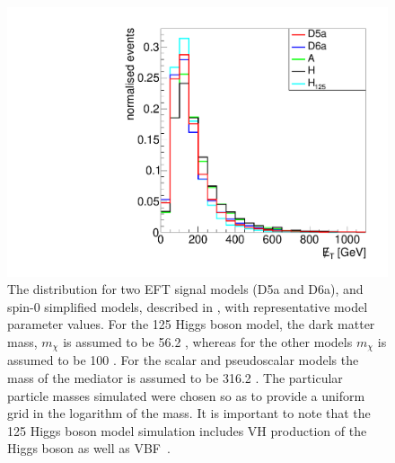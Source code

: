 \begin{figure}
  \includegraphics[width=\largefigwidth]{plots/interp/modelmet.pdf}
  \caption[The \MET distribution for two EFT signal models (D5a and D6a), and spin-0 simplified models, described in , with representative model parameter values. For the 125 \GeV Higgs boson model, the dark matter mass, $m_{\chi}$ is assumed to be 56.2 \GeV, whereas for the other models $m_{\chi}$ is assumed to be 100 \GeV . For the scalar and pseudoscalar models the mass of the mediator is assumed to be 316.2 \GeV. The particular particle masses simulated were chosen so as to provide a uniform grid in the logarithm of the mass. It is important to note that the 125 \GeV Higgs boson model simulation includes VH production of the Higgs boson as well as VBF.]{The \MET distribution for two EFT signal models (D5a and D6a), and spin-0 simplified models, described in , with representative model parameter values. For the 125 \GeV Higgs boson model, the dark matter mass, $m_{\chi}$ is assumed to be 56.2 \GeV, whereas for the other models $m_{\chi}$ is assumed to be 100 \GeV . For the scalar and pseudoscalar models the mass of the mediator is assumed to be 316.2 \GeV. The particular particle masses simulated were chosen so as to provide a uniform grid in the logarithm of the mass. It is important to note that the 125 \GeV Higgs boson model simulation includes VH production of the Higgs boson as well as VBF~\cite{ourdmpaper}.}
  \label{fig:dmmodelkinematics}
\end{figure}

